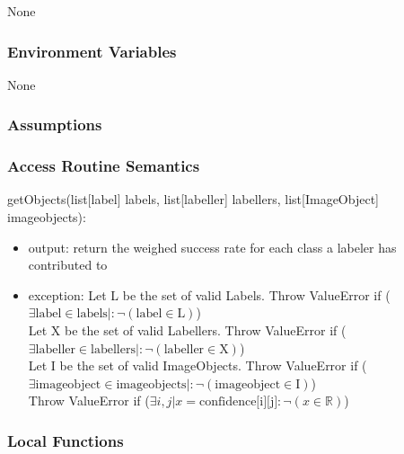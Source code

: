 \documentclass[12pt, titlepage]{article}
\begin{document}
 None
  
  \subsubsection{Environment Variables}
  
  None
  
  \subsubsection{Assumptions}
  
  
  \subsubsection{Access Routine Semantics}
  
  \noindent getObjects(list[label] labels, list[labeller] labellers, list[ImageObject] imageobjects):
  \begin{itemize}
  \item output: return the weighed success rate for each class a labeler has contributed to
  \item exception: Let L be the set of valid Labels. Throw ValueError if ($\exists \text{label} \in \text{labels} |: \neg (\text{label} \in \text{L})$)\\
  Let X be the set of valid Labellers. Throw ValueError if ($\exists \text{labeller} \in \text{labellers} |: \neg (\text{labeller} \in \text{X})$)\\
  Let I be the set of valid ImageObjects. Throw ValueError if ($\exists \text{imageobject} \in \text{imageobjects} |: \neg (\text{imageobject} \in \text{I})$)\\
  Throw ValueError if ($\exists i,j| x = \text{confidence[i][j]} : \neg (x \in \mathbb{R})$)\\
  \end{itemize}


  
  
  
  \subsubsection{Local Functions}
\end{document}
